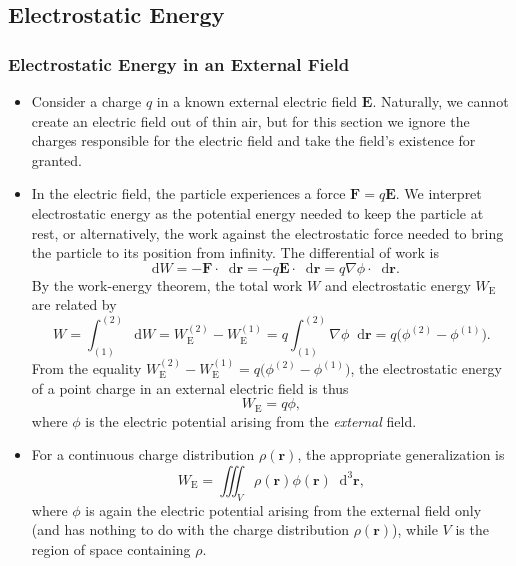 \documentclass[11pt, a4paper]{article}
\newcommand{\diff}{\mathop{}\!\mathrm{d}} %
\newcommand{\dr}{\diff^{3} \r}  %
\renewcommand{\vec}[1]{\bm{#1}} %
\renewcommand{\r}{\vec{r}}
\newcommand{\E}{\vec{E}} %
\renewcommand{\grad}{\nabla}
\begin{document}
\subsection{Electrostatic Energy}
\subsubsection{Electrostatic Energy in an External Field}
\begin{itemize}
	\item Consider a charge $ q $ in a known external electric field $ \E $. Naturally, we cannot create an electric field out of thin air, but for this section we ignore the charges responsible for the electric field and take the field's existence for granted.
	

	
	\item In the electric field, the particle experiences a force $ \vec{F} = q \E $. We interpret electrostatic energy as the potential energy needed to keep the particle at rest, or alternatively, the work against the electrostatic force needed to bring the particle to its position from infinity. The differential of work is
	\begin{equation*}
		\diff W = - \vec{F} \cdot \diff \r = - q \E \cdot  \diff \r = q \grad \phi \cdot \diff \r.
	\end{equation*}
	By the work-energy theorem, the total work $ W $ and electrostatic energy $ W_{\text{E}} $ are related by
	 \begin{equation*}
		W = \int_{(1)}^{(2)} \diff W = W_{\text{E}}^{(2)} - W_{\text{E}}^{(1)} = q \int_{(1)}^{(2)}\grad \phi \diff \r = q\big(\phi^{(2) }- \phi^{(1)}\big).
	\end{equation*}
	From the equality $ W_{\text{E}}^{(2)} - W_{\text{E}}^{(1)} = q\big(\phi^{(2) }- \phi^{(1)}\big) $, the electrostatic energy of a point charge in an external electric field is thus
	\begin{equation*}
		W_{\text{E}} = q \phi,
	\end{equation*}
	where $ \phi $ is the electric potential arising from the \textit{external} field. 
	
	\item For a continuous charge distribution $ \rho(\r) $, the appropriate generalization is
	\begin{equation*}
		W_{\text{E}} = \iiint_{V} \rho(\r) \phi (\r) \dr,
	\end{equation*}
	where $ \phi $ is again the electric potential arising from the external field only (and has nothing to do with the charge distribution $ \rho(\r) $), while $ V $ is the region of space containing $ \rho $.
\end{itemize}
\end{document}
